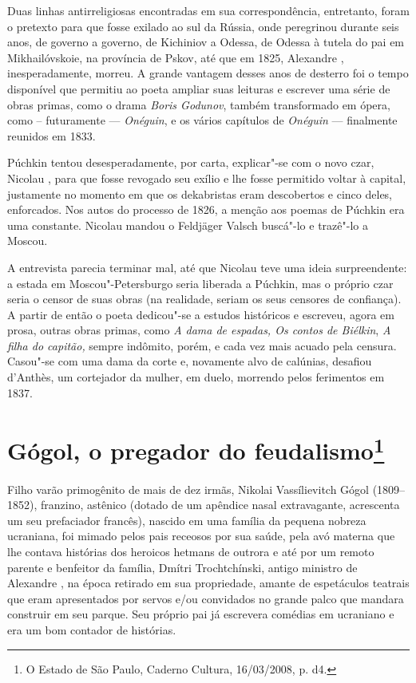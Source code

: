 Duas linhas antirreligiosas encontradas em sua correspondência,
entretanto, foram o pretexto para que fosse exilado ao sul da Rússia,
onde peregrinou durante seis anos, de governo a governo, de Kichiniov a
Odessa, de Odessa à tutela do pai em Mikhailóvskoie, na província de
Pskov, até que em 1825, Alexandre , inesperadamente, morreu. A grande
vantagem desses anos de desterro foi o tempo disponível que permitiu ao
poeta ampliar suas leituras e escrever uma série de obras primas, como o
drama \emph{Boris Godunov}, também transformado em ópera, como --
futuramente --- \emph{Onéguin}, e os vários capítulos de
\emph{Onéguin} --- finalmente reunidos em 1833.

Púchkin tentou desesperadamente, por carta, explicar"-se com o novo czar,
Nicolau , para que fosse revogado seu exílio e lhe fosse permitido
voltar à capital, justamente no momento em que os dekabristas eram
descobertos e cinco deles, enforcados. Nos autos do processo de 1826, a
menção aos poemas de Púchkin era uma constante. Nicolau mandou o
Feldjäger Valsch buscá"-lo e trazê"-lo a Moscou.

A entrevista parecia terminar mal, até que Nicolau teve uma ideia
surpreendente: a estada em Moscou"-Petersburgo seria liberada a Púchkin,
mas o próprio czar seria o censor de suas obras (na realidade, seriam
os seus censores de confiança). A partir de então o poeta dedicou"-se a
estudos históricos e escreveu, agora em prosa, outras obras primas,
como \emph{A dama de espadas, Os contos de Biélkin}, \emph{A filha do
capitão,} sempre indômito, porém, e cada vez mais acuado pela censura.
Casou"-se com uma dama da corte e, novamente alvo de calúnias, desafiou
d'Anthès, um cortejador da mulher, em duelo, morrendo pelos ferimentos
em 1837.



\chapter{Gógol, o pregador do feudalismo\footnote{O Estado de São Paulo,
  Caderno Cultura, 16/03/2008, p. d4.}}

Filho varão primogênito de mais de dez irmãs, Nikolai Vassílievitch
Gógol (1809--1852), franzino, astênico (dotado de um apêndice nasal
extravagante, acrescenta um seu prefaciador francês), nascido em uma
família da pequena nobreza ucraniana, foi mimado pelos pais receosos por
sua saúde, pela avó materna que lhe contava histórias dos heroicos
hetmans de outrora e até por um remoto parente e benfeitor da família,
Dmítri Trochtchínski, antigo ministro de Alexandre , na época retirado
em sua propriedade, amante de espetáculos teatrais que eram apresentados
por servos e/ou convidados no grande palco que mandara construir em seu
parque. Seu próprio pai já escrevera comédias em ucraniano e era um bom
contador de histórias.

